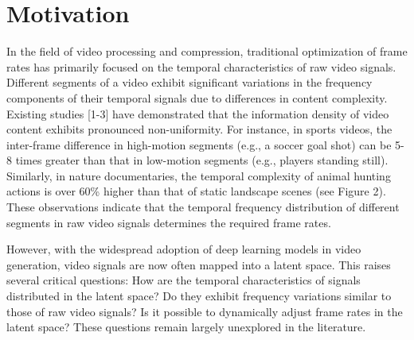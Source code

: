 


\section{Motivation}

In the field of video processing and compression, traditional optimization of frame rates has primarily focused on the temporal characteristics of raw video signals. Different segments of a video exhibit significant variations in the frequency components of their temporal signals due to differences in content complexity. Existing studies [1-3] have demonstrated that the information density of video content exhibits pronounced non-uniformity. For instance, in sports videos, the inter-frame difference in high-motion segments (e.g., a soccer goal shot) can be 5-8 times greater than that in low-motion segments (e.g., players standing still). Similarly, in nature documentaries, the temporal complexity of animal hunting actions is over 60\% higher than that of static landscape scenes (see Figure 2). These observations indicate that the temporal frequency distribution of different segments in raw video signals determines the required frame rates.

However, with the widespread adoption of deep learning models in video generation, video signals are now often mapped into a latent space. This raises several critical questions: How are the temporal characteristics of signals distributed in the latent space? Do they exhibit frequency variations similar to those of raw video signals? Is it possible to dynamically adjust frame rates in the latent space? These questions remain largely unexplored in the literature.

